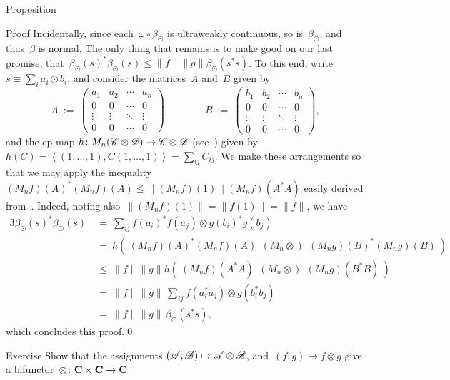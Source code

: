 \documentclass[a]{subfiles}
\begin{document}
\begin{parsec}
\begin{point}{Proposition}
\begin{point}{Proof}
Incidentally,
since each~$\omega\circ \beta_\odot$
is ultraweakly continuous,
so is~$\beta_\odot$,
and thus~$\beta$ is normal.
The only thing that remains
is to make good on our last promise,
that~$\beta_\odot(s)^*\beta_\odot(s)\leq 
\|f\|\|g\|\beta_\odot(s^*s)$.
To this end,
write $s\equiv \sum_i a_i\odot b_i$,
and consider
the matrices~$A$ and~$B$ given by
\begin{equation*}
A\ :=\  \begin{pmatrix}
a_1 & a_2 & \dotsb & a_n \\
0 & 0 & \dotsb & 0 \\
\vdots & \vdots & \ddots&\vdots \\
0 & 0 & \dotsb & 0
\end{pmatrix}
\qquad\qquad
B\ :=\  \begin{pmatrix}
b_1 & b_2 & \dotsb & b_n \\
0 & 0 & \dotsb & 0 \\
\vdots & \vdots & \ddots&\vdots \\
0 & 0 & \dotsb & 0
\end{pmatrix},
\end{equation*}
and the cp-map $h\colon M_n(\mathscr{C}\otimes \mathscr{D})\to \mathscr{C}\otimes \mathscr{D}$
(see~)
given by~$h(C)= \left<(1,\dotsc,1), C(1,\dotsc,1)\right> =\sum_{ij}C_{ij}$.
We make these arrangements
so that we
may apply the inequality
$(M_nf)(A)^*  (M_nf)(A)
\leq \|(M_nf)(1)\| (M_nf)(A^*A)$
easily derived from~.
Indeed,
noting also~$\|(M_nf)(1)\|=\|f(1)\|=\|f\|$,
we have
\begin{alignat*}{3}
	\beta_\odot(s)^*\beta_\odot(s) 
\ &=\ \textstyle \sum_{ij}f(a_i)^*f(a_j)\otimes g(b_i)^*g(b_j)\\
\ &=\ h(\ 
(M_nf)(A)^* (M_nf)(A) \ \ (M_n \otimes)\ \ 
(M_ng)(B)^*(M_ng)(B) \ ) \\
\ &\leq\  
\|f\|\|g\| 
h(\ (M_nf)(A^*A) \ \ (M_n \otimes)\ \ 
(M_ng)(B^*B) \ ) 
\\
\ &=\  
\|f\|\|g\| \,\textstyle \sum_{ij} f(a_i^*a_j)\otimes g(b_i^*b_j) \\
\ &= \ \|f\|\|g\|\,\beta_\odot(s^*s),
\end{alignat*}
which concludes this proof.\qed
\end{point}
\end{point}
\begin{point}{Exercise}%
Show that the assignments
$(\mathscr{A},\mathscr{B})\mapsto \mathscr{A}\otimes \mathscr{B}$,
and~$(f,g)\mapsto f\otimes g$
give a bifunctor~$\otimes\colon \mathbf{C}\times\mathbf{C}
\to\mathbf{C}$

\end{point}
\end{parsec}
\end{document}
